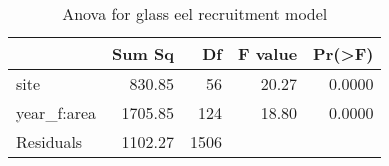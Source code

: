 \begin{table}[htbp]
\centering
\caption[table_anova]{Anova for glass eel recruitment model} 
\begin{tabularx}{0.8\textwidth}{lrrrr}
  \hline
 & Sum Sq & Df & F value & Pr(>F) \\ 
  \hline
site & 830.85 & 56 & 20.27 & 0.0000 \\ 
  year\_f:area & 1705.85 & 124 & 18.80 & 0.0000 \\ 
  Residuals & 1102.27 & 1506 &  &  \\ 
   \hline
\end{tabularx}
\end{table}
